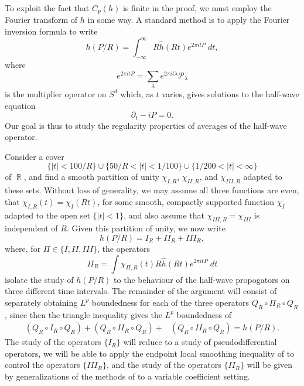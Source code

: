 \documentclass[dvipsnames,letterpaper,12pt]{article}
\DeclareMathOperator{\RR}{\mathbb{R}}
\begin{document}
To exploit the fact that $C_p(h)$ is finite in the proof, we must employ the Fourier transform of $h$ in some way. A standard method is to apply the Fourier inversion formula to write
%
\[ h(P/R) = \int_{-\infty}^\infty R \widehat{h}(Rt) e^{2 \pi i t P}\; dt, \]
%
where
%
\[ e^{2 \pi i t P} = \sum_\lambda e^{2 \pi i t \lambda} \mathcal{P}_\lambda \]
%
is the multiplier operator on $S^d$ which, as $t$ varies, gives solutions to the half-wave equation
%
\[ \partial_t - i P = 0. \]
%
%
%
%
%
%
%
%
%
%
%
%
%
%
Our goal is thus to study the regularity properties of averages of the half-wave operator.

Consider a cover
%
\[ \{ |t| < 100/R \} \cup \{ 50/R < |t| < 1/100 \} \cup \{ 1/200 < |t| < \infty \} \]
%
of $\RR$, and find a smooth partition of unity $\chi_{I,R}$, $\chi_{II,R}$, and $\chi_{III,R}$ adapted to these sets. Without loss of generality, we may assume all three functions are even, that $\chi_{I,R}(t) = \chi_I(Rt)$, for some smooth, compactly supported function $\chi_I$ adapted to the open set $\{ |t| < 1 \}$, and also assume that $\chi_{III,R} = \chi_{III}$ is independent of $R$. Given this partition of unity, we now write
%
\[ h(P/R) = I_R + II_R + III_R, \]
%
where, for $\Pi \in \{ I, II, III \}$, the operators
%
\[ \Pi_R = \int \chi_{\Pi,R}(t) R \widehat{h}(Rt) e^{2 \pi i t P}\; dt \]
%
isolate the study of $h(P/R)$ to the behaviour of the half-wave propogators on three different time intervals. The remainder of the argument will consist of separately obtaining $L^p$ boundedness for each of the three operators $Q_R \circ \Pi_R \circ Q_R$, since then the triangle inequality gives the $L^p$ boundedness of
%
\begin{align*}
    (Q_R \circ I_R \circ Q_R) + (Q_R \circ II_R \circ Q_R) + &(Q_R \circ II_R \circ Q_R) = h(P/R).
\end{align*}
%
The study of the operators $\{ I_R \}$ will reduce to a study of pseudodifferential operators, we will be able to apply the endpoint local smoothing inequality of \cite{LeeSeeger} to control the operators $\{ III_R \}$, and the study of the operators $\{ II_R \}$ will be given by generalizations of the methods of \cite{HeoandNazarovandSeeger} to a variable coefficient setting.
\end{document}
